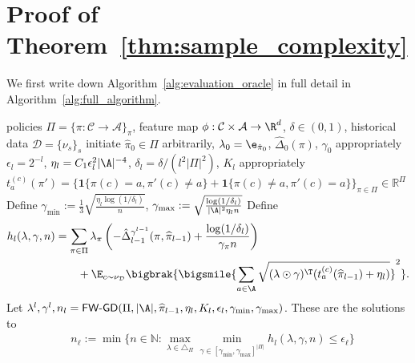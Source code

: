 \documentclass{article}
\newcommand{\mc}[1]{\mathcal{#1}}
\newcommand{\pill}{\widehat{\pi}_{l-1}}
\newcommand{\1}{\mathbf{1}}
\begin{document}
\section{Proof of Theorem~\ref{thm:sample_complexity}}\label{sec:complexity}

We first write down Algorithm~\ref{alg:evaluation_oracle} in full detail in Algorithm~\ref{alg:full_algorithm}. 
\begin{algorithm}[!htb]
\footnotesize
\caption{Full CODA Algorithm}
\begin{algorithmic}[1]\label{alg:full_algorithm}
\REQUIRE policies $\Pi = \{ \pi : \mc{C} \rightarrow \mc{A} \}_\pi$, feature map $\phi : \mc{C} \times \mc{A} \rightarrow \R^d$, $\delta\in (0,1)$, historical data $\mc{D} = \{ \nu_s \}_s$
\STATE initiate $\hat{\pi}_0\in\Pi$ arbitrarily, $\lambda_0=\e_{\hat{\pi}_0}$, $\hat{\Delta}_0(\pi)$, $\gamma_0$ appropriately
\STATE $\epsilon_l=2^{-l}$, $\eta_l=C_1\epsilon_l^2|\A|^{-4}$, $\delta_l=\delta/(l^2|\Pi|^2)$, $K_l$ appropriately
\STATE $t_{a}^{(c)}(\pi')=\{\1\{\pi(c)=a,\pi'(c)\ne a\}+\1\{\pi(c)\ne a,\pi'(c)=a\}\}_{\pi\in \Pi}\in \mathbb{R}^{\Pi}$
\STATE Define $\gamma_{\min}:=\frac{1}{3}\sqrt{\frac{\eta_l\log(1/\delta_l)}{n}}$, $\gamma_{\max}:=\sqrt{\frac{\log(1/\delta_l)}{|\A|^2\eta_l n}}$
\STATE Define
\begin{align}
    h_l(\lambda,\gamma,n)&=\sum_{\pi\in\Pi}\lambda_\pi\left(-\hat{\Delta}_{l-1}^{\gamma^{l-1}}(\pi,\pill)+\frac{\log(1/\delta_l)}{\gamma_\pi n}\right)\nonumber\\
    &\qquad+\E_{c\sim\nu_{\mathcal{D}}}\bigbrak{\bigsmile{\sum_{a\in\A}\sqrt{(\lambda\odot \gamma)^\T (t_a^{(c)}(\pill)+\eta_l)}}^2}.\label{eqn:C_1}
\end{align}
\STATE Let $\lambda^{l}, \gamma^l, n_l=\textsf{FW-GD}(\Pi,|\A|,\pill,\eta_l, K_l,\epsilon_l,\gamma_{\min},\gamma_{\max})$. These are the solutions to %
\begin{align}
    & n_{\ell} := \min\{n\in \mathbb{N}: \max_{\lambda\in\triangle_\Pi}\min_{\gamma\in[\gamma_{\min},\gamma_{\max}]^{|\Pi|}}h_l(\lambda,\gamma,n)\leq \epsilon_{\ell}\}
\end{align}

\end{algorithmic}
\end{algorithm}
\end{document}
